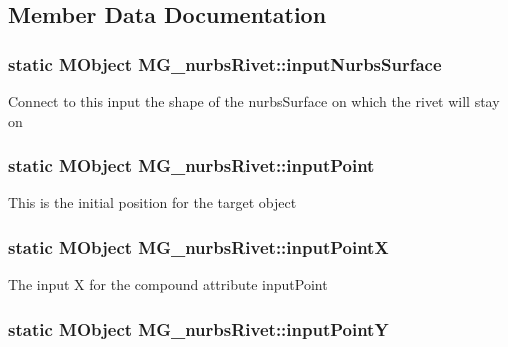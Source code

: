 \subsection{Member Data Documentation}
\hypertarget{class_m_g__nurbs_rivet_a4360c781254c835e560f7c78ef9e6481}{
\subsubsection[{input\-Nurbs\-Surface}]{\setlength{\rightskip}{0pt plus 5cm}static M\-Object M\-G\-\_\-nurbs\-Rivet\-::input\-Nurbs\-Surface\hspace{0.3cm}{\ttfamily [static]}}}\label{class_m_g__nurbs_rivet_a4360c781254c835e560f7c78ef9e6481}
Connect to this input the shape of the nurbs\-Surface on which the rivet will stay on \hypertarget{class_m_g__nurbs_rivet_a29e50ce621268c3947f456f3e43bfa25}{
\subsubsection[{input\-Point}]{\setlength{\rightskip}{0pt plus 5cm}static M\-Object M\-G\-\_\-nurbs\-Rivet\-::input\-Point\hspace{0.3cm}{\ttfamily [static]}}}\label{class_m_g__nurbs_rivet_a29e50ce621268c3947f456f3e43bfa25}
This is the initial position for the target object \hypertarget{class_m_g__nurbs_rivet_a5c09cb3fe1b1eb73e8f75176b8e7b723}{
\subsubsection[{input\-Point\-X}]{\setlength{\rightskip}{0pt plus 5cm}static M\-Object M\-G\-\_\-nurbs\-Rivet\-::input\-Point\-X\hspace{0.3cm}{\ttfamily [static]}}}\label{class_m_g__nurbs_rivet_a5c09cb3fe1b1eb73e8f75176b8e7b723}
The input X for the compound attribute input\-Point \hypertarget{class_m_g__nurbs_rivet_a9d55b7bdff71504f9531f8924cfc7d10}{
\subsubsection[{input\-Point\-Y}]{\setlength{\rightskip}{0pt plus 5cm}static M\-Object M\-G\-\_\-nurbs\-Rivet\-::input\-Point\-Y\hspace{0.3cm}{\ttfamily [static]}}}\label{class_m_g__nurbs_rivet_a9d55b7bdff71504f9531f8924cfc7d10}

